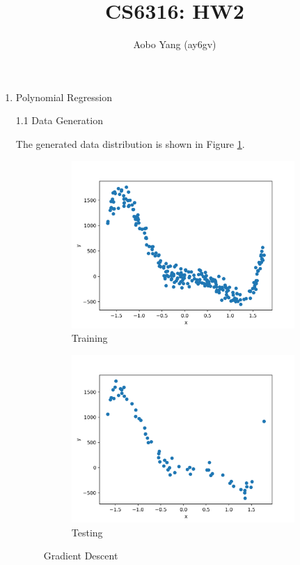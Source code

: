 \documentclass[11pt]{article}
\begin{document}
\author{Aobo Yang (ay6gv)}
\title{CS6316: HW2}
\maketitle

\medskip

\begin{enumerate}

\item
Polynomial Regression

1.1 Data Generation

\medskip

The generated data distribution is shown in Figure \ref{fig:data}.

\begin{figure}[!h]
  \centering
  \begin{subfigure}[b]{0.4\linewidth}
    \includegraphics[width=\linewidth]{figures/data_train.png}
    \caption{Training}
  \end{subfigure}
  \begin{subfigure}[b]{0.4\linewidth}
    \includegraphics[width=\linewidth]{figures/data_test.png}
    \caption{Testing}
  \end{subfigure}
  \caption{Gradient Descent}
  \label{fig:data}
\end{figure}



\end{enumerate}
\end{document}
